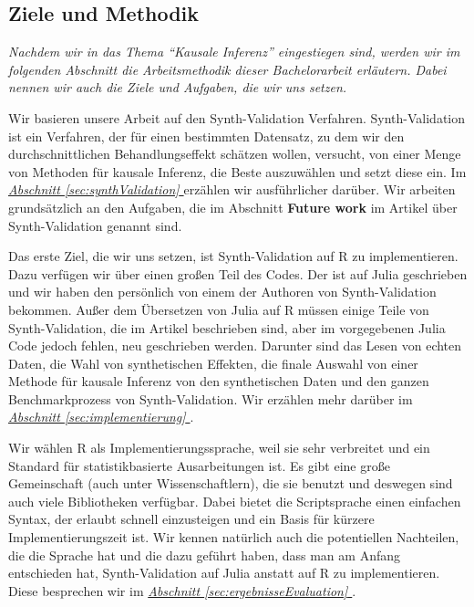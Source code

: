 \documentclass[12pt,a4paper,twoside]{scrartcl}
\numberwithin{equation}{section}
\newcommand{\refsec}[1]{\emph{\hyperref[#1]{Abschnitt \ref*{#1} }}}
\begin{document}
\subsection{Ziele und Methodik}\label{subsec:zieleUndMethodik}

\noindent
\textit{Nachdem wir in das Thema \enquote{Kausale Inferenz} eingestiegen sind, werden wir im folgenden Abschnitt die Arbeitsmethodik dieser Bachelorarbeit erläutern. Dabei nennen wir auch die Ziele und Aufgaben, die wir uns setzen.}\par

Wir basieren unsere Arbeit auf den Synth-Validation Verfahren\cite{schuler2017synth}.  Synth-Validation ist ein Verfahren, der für einen bestimmten Datensatz, zu dem wir den durchschnittlichen Behandlungseffekt schätzen wollen, versucht, von einer Menge von Methoden für kausale Inferenz, die Beste auszuwählen und setzt diese ein. Im \refsec{sec:synthValidation} erzählen wir ausführlicher darüber. Wir arbeiten grundsätzlich an den Aufgaben, die im Abschnitt \textbf{Future work} im Artikel über Synth-Validation\cite{schuler2017synth} genannt sind.\par

\noindent
Das erste Ziel, die wir uns setzen, ist Synth-Validation auf R zu implementieren. Dazu verfügen wir über einen großen Teil des Codes. Der ist auf Julia geschrieben und wir haben den persönlich von einem der Authoren von Synth-Validation bekommen. Außer dem Übersetzen von Julia auf R müssen einige Teile von Synth-Validation, die im Artikel beschrieben sind, aber im vorgegebenen Julia Code jedoch fehlen, neu geschrieben werden. Darunter sind das Lesen von echten Daten, die Wahl von synthetischen Effekten, die finale Auswahl von einer Methode für kausale Inferenz von den synthetischen Daten und den ganzen Benchmarkprozess von Synth-Validation. Wir erzählen mehr darüber im \refsec{sec:implementierung}.\par

\noindent
Wir wählen R als Implementierungssprache, weil sie sehr verbreitet und ein Standard für statistikbasierte Ausarbeitungen ist. Es gibt eine große Gemeinschaft (auch unter Wissenschaftlern), die sie benutzt und deswegen sind auch viele Bibliotheken verfügbar. Dabei bietet die Scriptsprache einen einfachen Syntax, der erlaubt schnell einzusteigen und ein Basis für kürzere Implementierungszeit ist. Wir kennen natürlich auch die potentiellen Nachteilen, die die Sprache hat und die dazu geführt haben, dass man am Anfang entschieden hat, Synth-Validation auf Julia anstatt auf R zu implementieren. Diese besprechen wir im \refsec{sec:ergebnisseEvaluation}.\par
   
\end{document}
